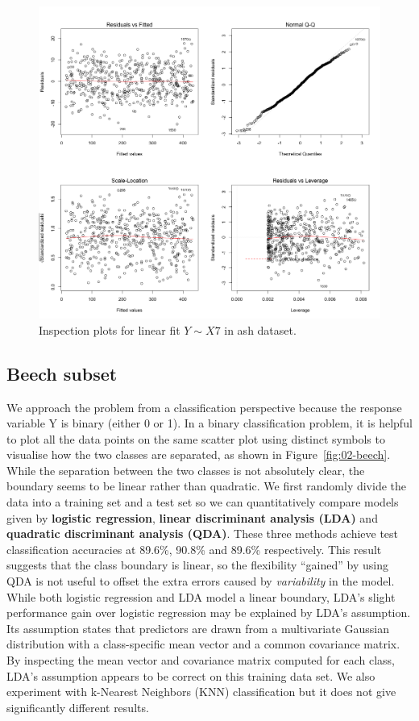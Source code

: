 \documentclass{article}
\begin{document}
\begin{figure}[h!]
  \includegraphics[width=\linewidth]{project/images/01-ash.png}
  \caption{Inspection plots for linear fit $Y \sim X7$ in ash dataset.}
  \label{fig:01-ash}
\end{figure}

\subsection{Beech subset}

We approach the problem from a classification perspective because the response variable Y is binary (either 0 or 1). In a binary classification problem, it is helpful to plot all the data points on the same scatter plot using distinct symbols to visualise how the two classes are separated, as shown in Figure~\ref{fig:02-beech}. While the separation between the two classes is not absolutely clear, the boundary seems to be linear rather than quadratic. We first randomly divide the data into a training set and a test set so we can quantitatively compare models given by  \textbf{logistic regression},  \textbf{linear discriminant analysis (LDA)} and  \textbf{quadratic discriminant analysis (QDA)}. These three methods achieve test classification accuracies at 89.6\%, 90.8\% and 89.6\% respectively. This result suggests that the class boundary is linear, so the flexibility ``gained'' by using QDA is not useful to offset the extra errors caused by {\em variability} in the model. While both logistic regression and LDA model a linear boundary, LDA's slight performance gain over logistic regression may be explained by LDA's assumption. Its assumption states that predictors are drawn from a multivariate Gaussian distribution with a class-specific mean vector and a common covariance matrix. By inspecting the mean vector and covariance matrix computed for each class, LDA's assumption appears to be correct on this training data set. We also experiment with k-Nearest Neighbors (KNN) classification but it does not give significantly different results.
\end{document}
